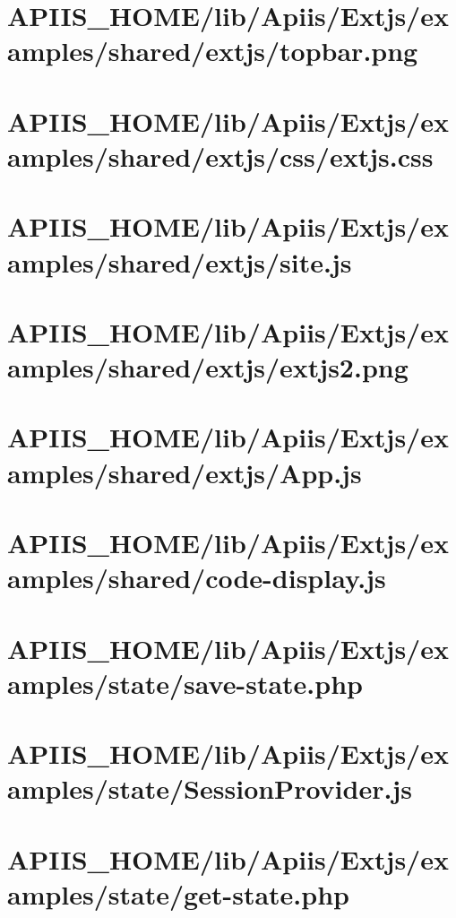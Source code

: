 \section{APIIS\_HOME/lib/Apiis/Extjs/examples/shared/extjs/topbar.png} 
\section{APIIS\_HOME/lib/Apiis/Extjs/examples/shared/extjs/css/extjs.css} 
\section{APIIS\_HOME/lib/Apiis/Extjs/examples/shared/extjs/site.js} 
\section{APIIS\_HOME/lib/Apiis/Extjs/examples/shared/extjs/extjs2.png} 
\section{APIIS\_HOME/lib/Apiis/Extjs/examples/shared/extjs/App.js} 
\section{APIIS\_HOME/lib/Apiis/Extjs/examples/shared/code-display.js} 
\section{APIIS\_HOME/lib/Apiis/Extjs/examples/state/save-state.php} 
\section{APIIS\_HOME/lib/Apiis/Extjs/examples/state/SessionProvider.js} 
\section{APIIS\_HOME/lib/Apiis/Extjs/examples/state/get-state.php} 
